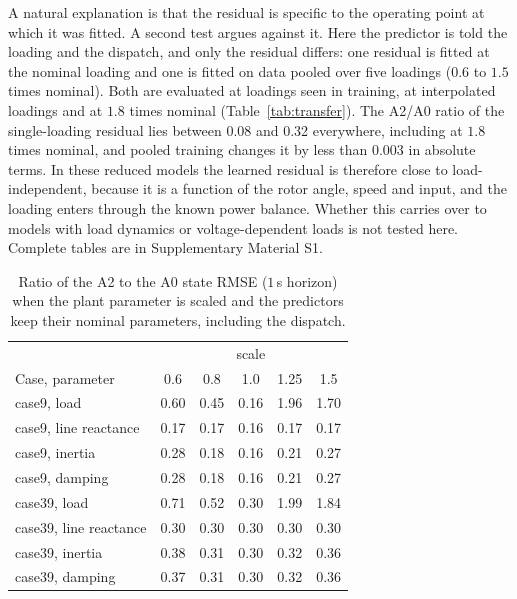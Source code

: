 \documentclass[preprint,12pt]{elsarticle}
\begin{document}
A natural explanation is that the residual is specific to the operating point at which it was fitted. A second test argues against it. Here the predictor is told the loading and the dispatch, and only the residual differs: one residual is fitted at the nominal loading and one is fitted on data pooled over five loadings ($0.6$ to $1.5$ times nominal). Both are evaluated at loadings seen in training, at interpolated loadings and at $1.8$ times nominal (Table~\ref{tab:transfer}). The A2/A0 ratio of the single-loading residual lies between 0.08 and 0.32 everywhere, including at $1.8$ times nominal, and pooled training changes it by less than 0.003 in absolute terms. In these reduced models the learned residual is therefore close to load-independent, because it is a function of the rotor angle, speed and input, and the loading enters through the known power balance. Whether this carries over to models with load dynamics or voltage-dependent loads is not tested here. Complete tables are in Supplementary Material S1.
\begin{table}[!t]\centering\small
\caption{Ratio of the A2 to the A0 state RMSE ($1$\,s horizon) when the plant parameter is scaled and the predictors keep their nominal parameters, including the dispatch.}
\label{tab:sens}
\begin{tabular}{lccccc}
\toprule
 & \multicolumn{5}{c}{scale}\\
Case, parameter & 0.6 & 0.8 & 1.0 & 1.25 & 1.5\\
\midrule
case9, load & 0.60 & 0.45 & 0.16 & 1.96 & 1.70\\
case9, line reactance & 0.17 & 0.17 & 0.16 & 0.17 & 0.17\\
case9, inertia & 0.28 & 0.18 & 0.16 & 0.21 & 0.27\\
case9, damping & 0.28 & 0.18 & 0.16 & 0.21 & 0.27\\
\midrule
case39, load & 0.71 & 0.52 & 0.30 & 1.99 & 1.84\\
case39, line reactance & 0.30 & 0.30 & 0.30 & 0.30 & 0.30\\
case39, inertia & 0.38 & 0.31 & 0.30 & 0.32 & 0.36\\
case39, damping & 0.37 & 0.31 & 0.30 & 0.32 & 0.36\\
\bottomrule
\end{tabular}
\end{table}
\end{document}
